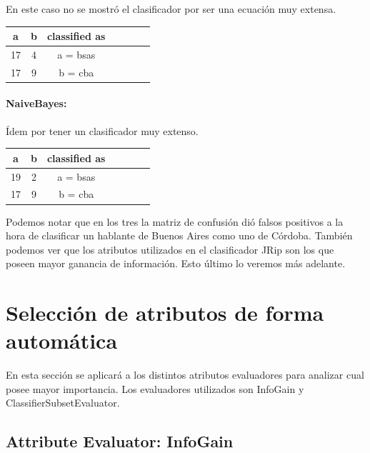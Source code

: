 \documentclass[11pt,a4paper,twoside]{tesis}
\begin{document}
En este caso no se mostró el clasificador por ser una ecuación muy extensa.

\begin{table}[H]
\centering
\begin{tabular}{|c|c|c|c|c|c|c|}
\hline
  a & b &  classified as \\ \hline
 17 & 4 &  a = bsas \\ \hline
 17 & 9 &  b = cba \\ \hline
\end{tabular}
\end{table}

\paragraph*{NaiveBayes:}

Ídem por tener un clasificador muy extenso.

\begin{table}[H]
\centering
\begin{tabular}{|c|c|c|c|c|c|c|}
\hline
  a & b & classified as \\ \hline
 19 & 2 &  a = bsas \\ \hline
 17 & 9 &  b = cba \\ \hline
\end{tabular}
\end{table}

Podemos notar que en los tres la matriz de confusión dió falsos positivos a la hora de clasificar un hablante de Buenos Aires como uno de Córdoba. También podemos ver que los atributos utilizados en el clasificador JRip son los que poseen mayor ganancia de información. Esto último lo veremos más adelante.

\section{Selección de atributos de forma automática}

En esta sección se aplicará a los distintos atributos evaluadores para analizar cual posee mayor importancia. Los evaluadores utilizados son InfoGain y ClassifierSubsetEvaluator. 

\subsection*{Attribute Evaluator: InfoGain}
\end{document}
